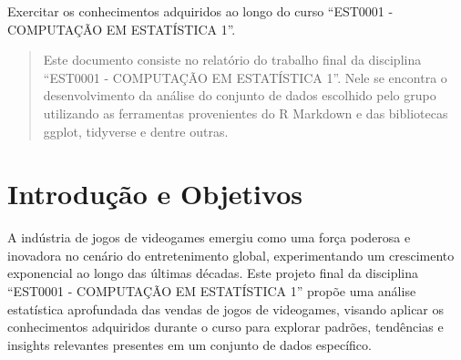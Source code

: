 \documentclass[draft]{agujournal2018}
\begin{document}



\begin{keypoints}
\item Exercitar os conhecimentos adquiridos ao longo do curso ``EST0001
- COMPUTAÇÃO EM ESTATÍSTICA 1''.
\end{keypoints}

%
%


\begin{abstract}
Este documento consiste no relatório do trabalho final da disciplina
``EST0001 - COMPUTAÇÃO EM ESTATÍSTICA 1''. Nele se encontra o
desenvolvimento da análise do conjunto de dados escolhido pelo grupo
utilizando as ferramentas provenientes do R Markdown e das bibliotecas
ggplot, tidyverse e dentre outras.
\end{abstract}
\section{Introdução e Objetivos}

A indústria de jogos de videogames emergiu como uma força poderosa e
inovadora no cenário do entretenimento global, experimentando um
crescimento exponencial ao longo das últimas décadas. Este projeto final
da disciplina ``EST0001 - COMPUTAÇÃO EM ESTATÍSTICA 1'' propõe uma
análise estatística aprofundada das vendas de jogos de videogames,
visando aplicar os conhecimentos adquiridos durante o curso para
explorar padrões, tendências e insights relevantes presentes em um
conjunto de dados específico.
\end{document}

